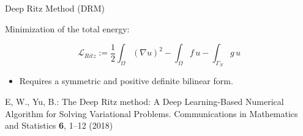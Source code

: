 \begin{frame} {Deep Ritz Method (DRM)}

 
Minimization of the total energy:

\vspace{0.5cm}

\begin{equation*}
 \mathcal{L}_{Ritz}  := \frac{1}{2} \int_{\Omega} (\nabla u )^2 - \int_{\Omega} f \, u - \int_{\Gamma_N }g \, u
\end{equation*}

\vspace{0.5cm}

\begin{itemize}
\item Requires a symmetric and positive definite bilinear form.
\end{itemize}

\vspace{1cm}

\begin{thebibliography}{1}
E, W., Yu, B.: The Deep Ritz method: A Deep Learning-Based Numerical Algorithm for Solving Variational Problems. Communications in Mathematics and Statistics \textbf{6}, 1--12 (2018)
\end{thebibliography}

\end{frame}
